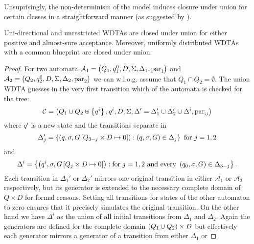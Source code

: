 Unsuprisingly, the non-determinism of the model induces closure under union for 
certain classes in a straightforward manner (as suggested by 
\cite[Proposition 14]{RandAutoInfTrees}). 
\begin{proposition}
  Uni-directional and unrestricted \acp{WDTA} are closed under union for 
  either positive and almost-sure acceptance. Moreover, uniformly distributed
  \acp{WDTA} with a common blueprint are closed under union.
  \label{prop:uniunrunion}
\end{proposition}
\begin{proof}
  For two automata
  $\mathcal{A}_{1} = \left(Q_{1}, q^{0}_{1}, D, \Sigma, \Delta_{1}, 
    \operatorname{par}_{1}\right)$ and $\mathcal{A}_{2} = \left(Q_{2}, q^{0}_{2}, D, \Sigma, 
  \Delta_{2}, \operatorname{par}_{2}\right)$ we can w.l.o.g. assume that 
  $Q_{1}\cap Q_{2} = \emptyset$. The union \ac{WDTA} guesses 
  in the very first transition which of the automata is checked for the tree:
  \begin{equation*}
    \mathcal{C} = \left(Q_{1}\cup Q_{2}\uplus\left\{q^{i}\right\}, q^{i}, D, \Sigma,
    \Delta' = \Delta_{1}'\cup\Delta_{2}'\cup\Delta^{i},\operatorname{par}_{\cup}\right)
  \end{equation*}
  where $q^{i}$ is a new state and the transitions separate in
  \begin{equation*}
    \Delta_{j}' = \left\{
      \left(q,\sigma,G\left[Q_{3-j}\times D\mapsto 0\right]\right):
        \left(q,\sigma,G\right)\in\Delta_{j}
    \right\}\text{ for }j = 1,2
  \end{equation*}
  and
  \begin{equation*}
    \Delta^{i} = \left\{
      \left(q^{i},\sigma,G\left[Q_{j}\times D\mapsto 0\right]\right):
        \text{for }j = 1,2 \text{ and every } 
        \left(q_{0},\sigma,G\right)\in\Delta_{3-j}
    \right\}.
  \end{equation*}
  Each transition in $\Delta_{1}'$ or $\Delta_{2}'$ mirrors one original 
  transition in either $\mathcal{A}_{1}$ or $\mathcal{A}_{2}$ respectively, but
  its generator is extended to the necessary complete domain of $Q\times D$ for
  formal reasons. Setting all transitions for states of the other automaton to
  zero ensures that it precisely simulates the original transition. On the
  other hand we have $\Delta^{i}$ as the union of all initial transitions from 
  $\Delta_{1}$ and $\Delta_{2}$. Again the generators are defined for the 
  complete domain $\left(Q_{1}\cup Q_{2}\right)\times D$ but effectively each
  generator mirrors a generator of a transition from either $\Delta_{1}$ or

\end{proof}
